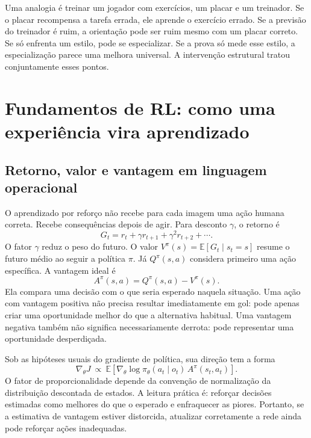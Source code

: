 \documentclass[11pt,a4paper]{article}
\newcommand{\E}{\mathbb{E}}
\begin{document}
Uma analogia é treinar um jogador com exercícios, um placar e um treinador. Se o placar recompensa a tarefa errada, ele aprende o exercício errado. Se a previsão do treinador é ruim, a orientação pode ser ruim mesmo com um placar correto. Se só enfrenta um estilo, pode se especializar. Se a prova só mede esse estilo, a especialização parece uma melhora universal. A intervenção estrutural tratou conjuntamente esses pontos.

\section{Fundamentos de RL: como uma experiência vira aprendizado}
\subsection{Retorno, valor e vantagem em linguagem operacional}
O aprendizado por reforço não recebe para cada imagem uma ação humana correta. Recebe consequências depois de agir. Para desconto $\gamma$, o retorno é
\begin{equation}
 G_t=r_t+\gamma r_{t+1}+\gamma^2r_{t+2}+\cdots.
\end{equation}
O fator $\gamma$ reduz o peso do futuro. O valor $V^\pi(s)=\E[G_t\mid s_t=s]$ resume o futuro médio ao seguir a política $\pi$. Já $Q^\pi(s,a)$ considera primeiro uma ação específica. A vantagem ideal é
\begin{equation}
 A^\pi(s,a)=Q^\pi(s,a)-V^\pi(s).
\end{equation}
Ela compara uma decisão com o que seria esperado naquela situação. Uma ação com vantagem positiva não precisa resultar imediatamente em gol: pode apenas criar uma oportunidade melhor do que a alternativa habitual. Uma vantagem negativa também não significa necessariamente derrota: pode representar uma oportunidade desperdiçada.

Sob as hipóteses usuais do gradiente de política, sua direção tem a forma
\begin{equation}
 \nabla_\theta J\ \propto\
 \E\!\left[\nabla_\theta\log\pi_\theta(a_t\mid o_t)\,A^\pi(s_t,a_t)\right].
 \label{eq:pg}
\end{equation}
O fator de proporcionalidade depende da convenção de normalização da distribuição descontada de estados. A leitura prática é: reforçar decisões estimadas como melhores do que o esperado e enfraquecer as piores. Portanto, se a estimativa de vantagem estiver distorcida, atualizar corretamente a rede ainda pode reforçar ações inadequadas.
\end{document}
